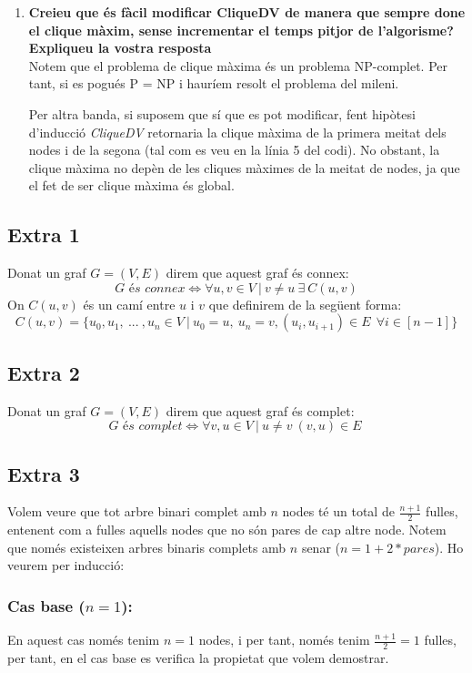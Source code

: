 \documentclass[a4paper,12pt]{article}
\begin{document}
\begin{enumerate}[label=(\alph*)]
    \item \textbf{Creieu que és fàcil modificar CliqueDV de manera que sempre done el clique màxim,
    sense incrementar el temps pitjor de l'algorisme? Expliqueu la vostra resposta} \\
    Notem que el problema de clique màxima és un problema NP-complet. Per tant, si es pogués P = NP i hauríem resolt el problema del mileni.

    Per altra banda, si suposem que sí que es pot modificar, fent hipòtesi d'inducció \textit{CliqueDV} retornaria la clique màxima de la primera meitat dels nodes i de la segona (tal com es veu en la línia 5 del codi). No obstant, la clique màxima no depèn de les cliques màximes de la meitat de nodes, ja que el fet de ser clique màxima és global.
    
    \end{enumerate}

\newpage

\subsection*{Extra 1}
Donat un graf $G = (V,E)$ direm que aquest graf és connex:
$$G \textit{ és connex} \Longleftrightarrow \forall u, v \in V \ | \ v \neq u \ \exists \ C(u,v)$$
On $C(u,v)$ és un camí entre $u$ i $v$ que definirem de la següent forma:
$$C(u,v) = \{u_0, u_1, \ ... \ , u_n \in V \ | \ u_0 = u, \ u_n = v, (u_i, u_{i+1}) \in E \ \ \forall i \in [n-1]\}$$

\subsection*{Extra 2}
Donat un graf $G = (V,E)$ direm que aquest graf és complet:
$$G \textit{ és complet} \Longleftrightarrow \forall v, u \in V \ | \ u \neq v \ (v, u) \in E \ $$

\subsection*{Extra 3}
Volem veure que tot arbre binari complet amb $n$ nodes té un total de $\frac{n+1}{2}$ fulles, entenent com a fulles aquells nodes que no són pares de cap altre node. Notem que només existeixen arbres binaris complets amb $n$ senar ($n = 1 + 2*pares$). Ho veurem per inducció:
\subsubsection*{Cas base ($n = 1$):}
En aquest cas només tenim $n=1$ nodes, i per tant, només tenim $\frac{n+1}{2} = 1$ fulles, per tant, en el cas base es verifica la propietat que volem demostrar.
\end{document}
